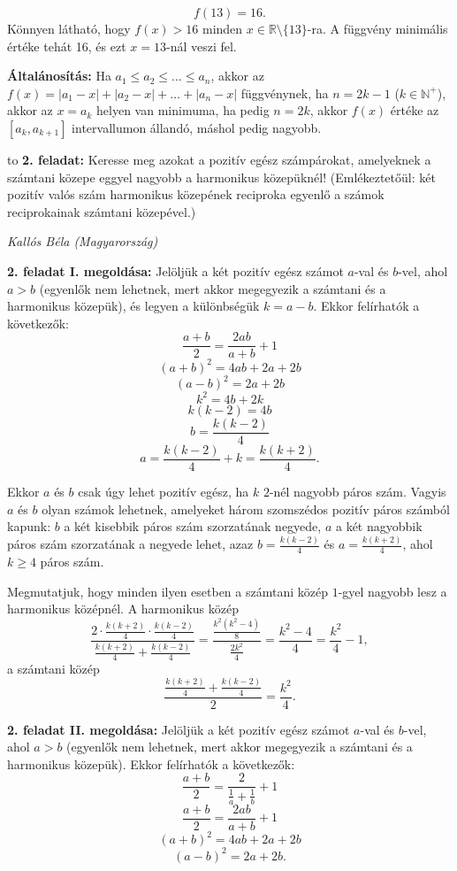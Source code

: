 \documentclass[a4paper,10pt]{article}
\def\ki#1#2{\hfill {\it #1 (#2)}\medskip}
\begin{document}
$$f(13)=16.$$
Könnyen látható, hogy $f(x) > 16$ minden $x\in \mathbb{R} \setminus \{13\}$-ra. A függvény minimális értéke tehát 16, és ezt $x=13$-nál veszi fel.

{\bf Általánosítás: }
Ha $a_1\le a_2 \le \dots \le a_n$, akkor az $f(x)=|a_1-x|+|a_2-x|+\dots+|a_n-x|$ függvénynek, ha $n=2k-1$ ($k\in \mathbb{N}^+$), akkor az $x=a_k$ helyen van minimuma, ha pedig $n=2k$, akkor $f(x)$ értéke az $\left[a_k, a_{k+1}\right]$ intervallumon állandó, máshol pedig nagyobb.
\medskip

\hbox to 
{\bf 2. feladat: }
Keresse meg azokat a pozitív egész számpárokat, amelyeknek a számtani közepe eggyel nagyobb a harmonikus közepüknél!
(Emlékeztetőül: két pozitív valós szám harmonikus közepének reciproka egyenlő a számok reciprokainak számtani közepével.)

\ki{Kallós Béla}{Magyarország}\medskip

{\bf 2. feladat I. megoldása: }
Jelöljük a két pozitív egész számot $a$-val és $b$-vel, ahol $a>b$ (egyenlők nem lehetnek,
mert akkor megegyezik a számtani és a harmonikus közepük), és legyen a különbségük $k=a-b$. Ekkor felírhatók a következők:
$$\frac{a+b}{2}=\frac{2ab}{a+b}+1$$
$$(a+b)^2=4ab+2a+2b$$
$$(a-b)^2=2a+2b$$
$$k^2=4b+2k$$
$$k(k-2)=4b$$
$$b=\frac{k(k-2)}{4}$$
$$a=\frac{k(k-2)}{4}+k=\frac{k(k+2)}{4}.$$

Ekkor $a$ és $b$ csak úgy lehet pozitív egész, ha $k$ $2$-nél nagyobb páros szám.
Vagyis $a$ és $b$ olyan számok lehetnek, amelyeket három szomszédos pozitív páros
számból kapunk: $b$ a két kisebbik páros szám szorzatának negyede, $a$ a két nagyobbik
páros szám szorzatának a negyede lehet, azaz $b=\frac{k(k-2)}{4}$ és $a=\frac{k(k+2)}{4}$, ahol $k\ge 4$
páros szám.

Megmutatjuk, hogy minden ilyen esetben a számtani közép $1$-gyel nagyobb lesz a
harmonikus középnél. A harmonikus közép 
$$\frac{2\cdot \frac{k(k+2)}{4}\cdot \frac{k(k-2)}{4}}{\frac{k(k+2)}{4}+\frac{k(k-2)}{4}}=\frac{\frac{k^2(k^2-4)}{8}}{\frac{2k^2}{4}}=\frac{k^2-4}{4}=\frac{k^2}{4}-1,$$
a számtani közép $$\frac{\frac{k(k+2)}{4}+\frac{k(k-2)}{4}}{2}=\frac{k^2}{4}.$$

{\bf 2. feladat II. megoldása: }
Jelöljük a két pozitív egész számot $a$-val és $b$-vel, ahol $a>b$ (egyenlők nem lehetnek, mert akkor megegyezik a számtani és a harmonikus közepük). Ekkor felírhatók a kö\-vet\-ke\-zők:
$$\frac{a+b}{2}=\frac{2}{\frac{1}{a}+\frac{1}{b}}+1$$
$$\frac{a+b}{2}=\frac{2ab}{a+b}+1$$
$$(a+b)^2=4ab+2a+2b$$
$$(a-b)^2=2a+2b.$$
\end{document}
